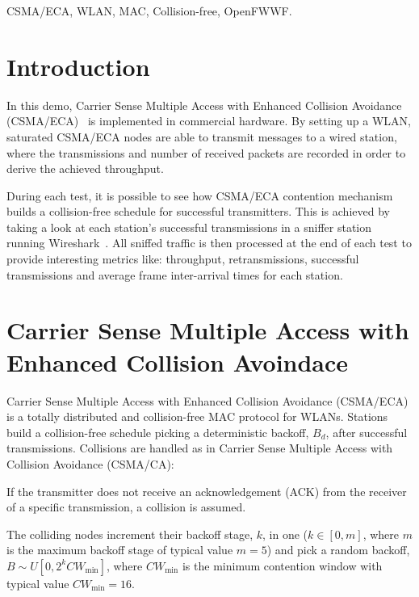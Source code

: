\documentclass[conference]{IEEEtran}
\begin{document}
\begin{IEEEkeywords}
CSMA/ECA, WLAN, MAC, Collision-free, OpenFWWF.
\end{IEEEkeywords}

\maketitle

\section{Introduction}\label{intro}
In this demo, Carrier Sense Multiple Access with Enhanced Collision Avoidance (CSMA/ECA)~\cite{barcelo2008lba} is implemented in commercial hardware. By setting up a WLAN, saturated CSMA/ECA nodes are able to transmit messages to a wired station, where the transmissions and number of received packets are recorded in order to derive the achieved throughput.

During each test, it is possible to see how CSMA/ECA contention mechanism builds a collision-free schedule for successful transmitters. This is achieved by taking a look at each station's successful transmissions in a sniffer station running Wireshark~\cite{combs2007wireshark}. All sniffed traffic is then processed at the end of each test to provide interesting metrics like: throughput, retransmissions, successful transmissions and average frame inter-arrival times for each station.

\section{Carrier Sense Multiple Access with Enhanced Collision Avoindace}

Carrier Sense Multiple Access with Enhanced Collision Avoidance (CSMA/ECA) is a totally distributed and collision-free MAC protocol for WLANs. Stations build a collision-free schedule picking a deterministic backoff, $B_{d}$, after successful transmissions. Collisions are handled as in Carrier Sense Multiple Access with Collision Avoidance (CSMA/CA):
\begin{compactitem}
	\item If the transmitter does not receive an acknowledgement (ACK) from the receiver of a specific transmission, a collision is assumed.
	\item The colliding nodes increment their backoff stage, $k$, in one ($k\in[0,m]$, where $m$ is the maximum backoff stage of typical value $m=5$) and pick a random backoff, $B\sim U[0,2^{k}CW_{\min}]$, where $CW_{\min}$ is the minimum contention window with typical value $CW_{\min}=16$.
\end{compactitem}
\end{document}
